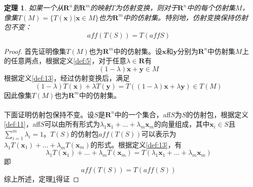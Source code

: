 \documentclass[a4paper,11pt,oneside]{article}
\newtheorem{theorem}{定理}[section]
\newtheorem{proof}{证明}[section]
\begin{document}
			\begin{theorem}
				\label{the:1.6}
				如果一个从$\textbf{R}^{n}$到$\textbf{R}^{m}$的映射$T$为仿射变换，则对于$\textbf{R}^{n}$中的每个仿射集$M$，像集$T(M)=\{T(\textbf{x})|\textbf{x}\in M\}$也为$\textbf{R}^{m}$中的仿射集。特别地，仿射变换保持仿射包不变：
				$$aff(T(S))=T(affS)$$
			\end{theorem}
			\begin{proof}
				首先证明像集$T(M)$也为$\textbf{R}^{m}$中的仿射集。设$\textbf{x}$和$\textbf{y}$分别为$\textbf{R}^{n}$中仿射集$M$上的任意两点，根据定义\ref{def:5}，对于任意$\lambda \in \textbf{R}$有
				$$(1-\lambda)\textbf{x}+\textbf{y}\in M$$
				根据定义\ref{def:13}，经过仿射变换后，满足
				$$(1-\lambda)T(\textbf{x})+\lambda T(\textbf{y})=T((1-\lambda)\textbf{x}+\lambda \textbf{y})\in T(M)$$
				因此像集$T(M)$也为$\textbf{R}^{m}$中的仿射集。\\
				\\
				下面证明仿射包保持不变。设$S$是$\textbf{R}^{n}$中的一个集合，aff$S$为$S$的仿射包，根据定义\ref{def:11}，aff$S$可以由所有形式为$\lambda_{1}\textbf{x}_{1}+...+\lambda_{m}\textbf{x}_{m}$的向量组成，其中$\textbf{x}_{i}\in S$且$\sum_{i=1}^{m}\lambda_{i}=1$。$T(S)$的仿射包$aff(T(S))$可以表示为$\lambda_{1}T(\textbf{x}_{1})+...+\lambda_{m}T(\textbf{x}_{m})$的形式。根据定义\ref{def:13}，有
				$$\lambda_{1}T(\textbf{x}_{1})+...+\lambda_{m}T(\textbf{x}_{m})=T(\lambda_{1}\textbf{x}_{1}+...+\lambda_{m}\textbf{x}_{m})$$
				即
				$$aff(T(S))=T(aff(S))$$
				综上所述，定理\ref{the:1.6}得证
			\end{proof}
\end{document}
